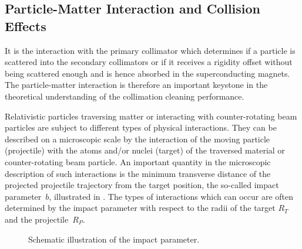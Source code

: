 \subsection{Particle-Matter Interaction and Collision Effects}  \label{chap:ionmatterinteraction}

It is the interaction with the primary collimator which determines if a particle is scattered into the secondary collimators or if it receives a rigidity offset without being scattered enough and is hence absorbed in the superconducting magnets. The particle-matter interaction is therefore an important keystone in the theoretical understanding of the collimation cleaning performance. %

Relativistic particles traversing matter or interacting with counter-rotating beam particles are subject to different types of physical interactions. They can be described on a microscopic scale by the interaction of the moving particle (projectile) with the atoms and/or nuclei (target) of the traversed material or counter-rotating beam particle.  An important quantity in the microscopic description of such interactions is the minimum transverse distance of the projected projectile trajectory from the target position, the so-called impact \mbox{parameter $b$}, illustrated in . The types of interactions which can occur are often determined by the impact parameter with respect to the radii of the target $R_T$ and the \mbox{projectile $R_P$}. 

 \begin{figure}[b]  
  \centering
  \caption{Schematic illustration of the impact parameter.}
  \label{pic:impact}
\end{figure}



